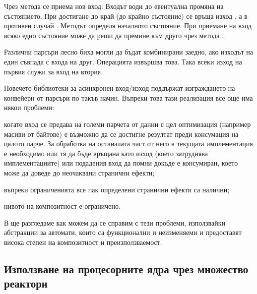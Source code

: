 Чрез метода  се приема нов вход. Входът води до евентуална промяна на състоянието. При достигане до край (до крайно състояние) се връща изход , а в противен случай . Методът  определя началното състояние. При приемане на вход всяко едно състояние може да реши да премине към друго чрез метода .

Различни парсъри лесно биха могли да бъдат комбинирани заедно, ако изходът на един съвпада с входа на друг. Операцията \code{>>} извършва това. Така всеки изход на първия служи за вход на втория.

Повечето библиотеки за асинхронен вход/изход поддържат изграждането на конвейерн от парсъри по такъв начин. Въпреки това тази реализация все още има някои проблеми:

\begin{itemize*}
  \item когато вход се предава на големи парчета от данни с цел оптимизация (например масиви от байтове) е възможно да се достигне резултат преди консумация на цялото парче. За обработка на останалата част от него в текущата имплементация е необходимо или тя да бъде връщана като изход (което затруднява имплементациите) или подадения вход да помни докъде е консумиран, което може да доведе до неочаквани странични ефекти;
  
  \item въпреки ограниченията все пак определени странични ефекти са налични;
  
  \item нивото на композитност е ограничено.
\end{itemize*}

В  ще разгледаме как можем да се справим с тези проблеми, използвайки абстракции за автомати, които са функционални и неизменяеми и предоставят висока степен на композитност и преизползваемост.

\subsection{Използване на процесорните ядра чрез множество реактори}
\label{sec:multi-reactor-server}


